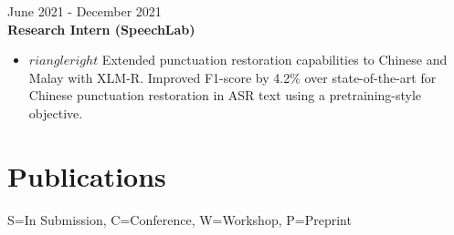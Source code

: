 \documentclass[11pt,letterpaper]{article}
\begin{document}
\begin{itemize}[leftmargin=*,label={},itemsep=4pt]
        \hfill June 2021 - December 2021\\
        \textbf{\textit{} Research Intern (SpeechLab)}\\
        \begin{itemize}
        \item $	riangleright$ Extended punctuation restoration capabilities to Chinese and Malay with XLM-R. Improved F1-score by 4.2\% over state-of-the-art for Chinese punctuation restoration in ASR text using a pretraining-style objective.\\
        \end{itemize}
\end{itemize}

\section*{Publications}
\small{S=In Submission, C=Conference, W=Workshop, P=Preprint}
\end{document}
